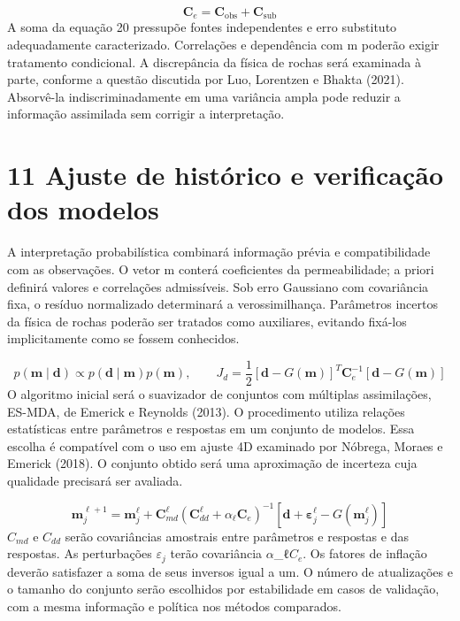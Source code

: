 \documentclass[12pt,a4paper]{article}
\begin{document}
\begin{equation}
\mathbf C_e=\mathbf C_{\mathrm{obs}}+\mathbf C_{\mathrm{sub}}
\end{equation}
A soma da equação 20 pressupõe fontes independentes e erro substituto adequadamente caracterizado. Correlações e dependência com m poderão exigir tratamento condicional. A discrepância da física de rochas será examinada à parte, conforme a questão discutida por Luo, Lorentzen e Bhakta (2021). Absorvê-la indiscriminadamente em uma variância ampla pode reduzir a informação assimilada sem corrigir a interpretação.\par

\newpage
\section*{11 Ajuste de histórico e verificação dos modelos}
A interpretação probabilística combinará informação prévia e compatibilidade com as observações. O vetor m conterá coeficientes da permeabilidade; a priori definirá valores e correlações admissíveis. Sob erro Gaussiano com covariância fixa, o resíduo normalizado determinará a verossimilhança. Parâmetros incertos da física de rochas poderão ser tratados como auxiliares, evitando fixá-los implicitamente como se fossem conhecidos.\par

\begin{equation}
p(\mathbf m\mid\mathbf d)\propto p(\mathbf d\mid\mathbf m)p(\mathbf m),\qquad J_d=\frac12[\mathbf d-G(\mathbf m)]^T\mathbf C_e^{-1}[\mathbf d-G(\mathbf m)]
\end{equation}
O algoritmo inicial será o suavizador de conjuntos com múltiplas assimilações, ES-MDA, de Emerick e Reynolds (2013). O procedimento utiliza relações estatísticas entre parâmetros e respostas em um conjunto de modelos. Essa escolha é compatível com o uso em ajuste 4D examinado por Nóbrega, Moraes e Emerick (2018). O conjunto obtido será uma aproximação de incerteza cuja qualidade precisará ser avaliada.\par

\begin{equation}
\mathbf m_j^{\ell+1}=\mathbf m_j^\ell+\mathbf C_{md}^\ell(\mathbf C_{dd}^\ell+\alpha_\ell\mathbf C_e)^{-1}[\mathbf d+\boldsymbol\varepsilon_j^\ell-G(\mathbf m_j^\ell)]
\end{equation}
\(C_{md}\) e \(C_{dd}\) serão covariâncias amostrais entre parâmetros e respostas e das respostas. As perturbações \(\varepsilon_{j}\) terão covariância \(\alpha\)\_ℓ\(C_{e}\). Os fatores de inflação deverão satisfazer a soma de seus inversos igual a um. O número de atualizações e o tamanho do conjunto serão escolhidos por estabilidade em casos de validação, com a mesma informação e política nos métodos comparados.\par
\end{document}
